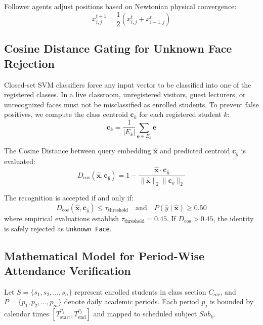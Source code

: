 \documentclass[conference]{IEEEtran}
\begin{document}
Follower agents adjust positions based on Newtonian physical convergence:
\begin{equation}
x_{i, j}^{t+1} = \frac{1}{2}\left(x_{i, j}^t + x_{i-1, j}^t\right)
\end{equation}

\subsection{Cosine Distance Gating for Unknown Face Rejection}
Closed-set SVM classifiers force any input vector to be classified into one of the registered classes. In a live classroom, unregistered visitors, guest lecturers, or unrecognized faces must not be misclassified as enrolled students. To prevent false positives, we compute the class centroid $\mathbf{c}_k$ for each registered student $k$:
\begin{equation}
\mathbf{c}_k = \frac{1}{|E_k|}\sum_{\mathbf{e} \in E_k} \mathbf{e}
\end{equation}

The Cosine Distance between query embedding $\hat{\mathbf{x}}$ and predicted centroid $\mathbf{c}_{\hat{y}}$ is evaluated:
\begin{equation}
D_{\cos}(\hat{\mathbf{x}}, \mathbf{c}_{\hat{y}}) = 1 - \frac{\hat{\mathbf{x}} \cdot \mathbf{c}_{\hat{y}}}{\|\hat{\mathbf{x}}\|_2 \|\mathbf{c}_{\hat{y}}\|_2}
\end{equation}

The recognition is accepted if and only if:
\begin{equation}
D_{\cos}(\hat{\mathbf{x}}, \mathbf{c}_{\hat{y}}) \le \tau_{\text{threshold}} \quad \text{and} \quad P(\hat{y} \mid \hat{\mathbf{x}}) \ge 0.50
\end{equation}
where empirical evaluations establish $\tau_{\text{threshold}} = 0.45$. If $D_{\cos} > 0.45$, the identity is safely rejected as \texttt{Unknown Face}.

\subsection{Mathematical Model for Period-Wise Attendance Verification}
Let $S = \{s_1, s_2, \dots, s_n\}$ represent enrolled students in class section $C_{\text{sec}}$, and $P = \{p_1, p_2, \dots, p_m\}$ denote daily academic periods. Each period $p_j$ is bounded by calendar times $[T_{\text{start}}^{p_j}, T_{\text{end}}^{p_j}]$ and mapped to scheduled subject $Sub_k$.
\end{document}

